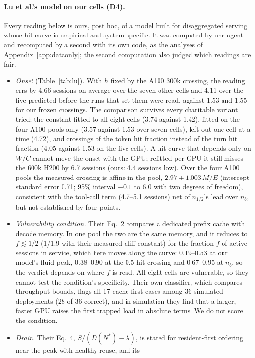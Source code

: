 \paragraph{Lu et al.'s model on our cells (D4).} Every reading below is ours, post hoc, of a model built for disaggregated serving
whose hit curve is empirical and system-specific. It was computed by one agent and recomputed by a second with its own code, as
the analyses of Appendix~\ref{app:dataonly}; the second computation also judged which readings are fair.
\begin{itemize}[leftmargin=*,nosep]
\item \emph{Onset} (Table~\ref{tab:lu}). With $h$ fixed by the A100 300k crossing, the reading errs by 4.66 sessions on average over
the seven other cells and 4.11 over the five predicted before the runs that set them were read, against 1.53 and 1.55 for our frozen crossings.
The comparison survives every charitable variant tried: the constant fitted to all eight cells (3.74 against 1.42), fitted on the four
A100 pools only (3.57 against 1.53 over seven cells), left out one cell at a time (4.72), and crossings of the token hit fraction
instead of the turn hit fraction (4.05 against 1.53 on the five cells). A hit curve that depends only on $W/C$ cannot move the onset
with the GPU; refitted per GPU it still misses the 600k H200 by 6.7 sessions (ours: 4.4 sessions low). Over the four A100 pools the measured
crossing is affine in the pool, $2.97+1.003\,M/\bar E$ (intercept standard error 0.71; 95\% interval $-0.1$ to 6.0 with two degrees of
freedom), consistent with the tool-call term (4.7--5.1 sessions) net of $n_{1/2}$'s lead over $n_b$, but not established by four points.
\item \emph{Vulnerability condition.} Their Eq.~2 compares a dedicated prefix cache with decode memory. In one pool the two are the
same memory, and it reduces to $f\lesssim1/2$ (1/1.9 with their measured cliff constant) for the fraction $f$ of active sessions
in service, which here moves along the curve:
0.19--0.53 at our model's fluid peak, 0.38--0.90 at the 0.5-hit crossing and 0.67--0.95 at $n_b$, so the verdict depends on where $f$ is
read. All eight cells are vulnerable, so they cannot test the condition's specificity. Their own classifier, which compares
throughput bounds, flags all 17 cache-first cases among 36 simulated deployments (28 of 36 correct), and in simulation they find
that a larger, faster GPU raises the first trapped load in absolute terms. We do not score the condition.
\item \emph{Drain.} Their Eq.~4, $S/(D(N^*)-\lambda)$, is stated for resident-first ordering near the peak with healthy reuse, and its

\end{itemize}
